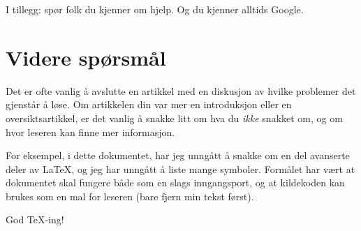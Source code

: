 \documentclass[a4paper, norsk]{article}  %
\begin{document}
I tillegg: spør folk du kjenner om hjelp. Og du kjenner alltids Google.

\section{Videre spørsmål}
\label{sec:slutt}

Det er ofte vanlig å avslutte en artikkel med en diskusjon av hvilke problemer det gjenstår å løse. Om artikkelen din var mer en introduksjon eller en oversiktsartikkel, er det vanlig å snakke litt om hva du \emph{ikke} snakket om, og om hvor leseren kan finne mer informasjon. 

For eksempel, i dette dokumentet, har jeg unngått å snakke om en del avanserte deler av \LaTeX, og jeg har unngått å liste mange symboler. Formålet har vært at dokumentet skal fungere både som en slags inngangsport, og at kildekoden kan brukes som en mal for leseren (bare fjern min tekst først).

God \TeX-ing!
\end{document}

